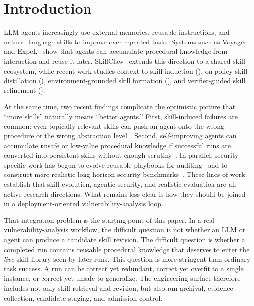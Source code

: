 ﻿\documentclass[preprint,12pt]{elsarticle}
\begin{document}
\section{Introduction}
\label{sec:introduction}

LLM agents increasingly use external memories, reusable instructions, and
natural-language skills to improve over repeated tasks.  Systems such as
Voyager~\cite{voyager} and ExpeL~\cite{expel} show that agents can
accumulate procedural knowledge from interaction and reuse it later.
SkillClaw~\cite{skillclaw} extends this direction to a shared skill
ecosystem, while recent work studies context-to-skill induction
(\cite{ctx2skill}), on-policy skill distillation (\cite{opid}),
environment-grounded skill formation (\cite{spark,skillevolbench}), and
verifier-guided skill refinement (\cite{trace2skill,veriskill}).

At the same time, two recent findings complicate the optimistic picture
that ``more skills'' naturally means ``better agents.''  First,
skill-induced failures are common: even topically relevant skills can push
an agent onto the wrong procedure or the wrong abstraction
level~\cite{skillharmful}.  Second, self-improving agents can accumulate
unsafe or low-value procedural knowledge if successful runs are converted
into persistent skills without enough scrutiny~\cite{misevolution}.  In
parallel, security-specific work has begun to evolve reusable playbooks for
auditing~\cite{evohunt} and to construct more realistic long-horizon
security benchmarks~\cite{secbenchpro}.  These lines of work establish that
skill evolution, agentic security, and realistic evaluation are all active
research directions.  What remains less clear is how they should be joined
in a deployment-oriented vulnerability-analysis loop.

That integration problem is the starting point of this paper.  In a real
vulnerability-analysis workflow, the difficult question is not whether an
LLM or agent can produce a candidate skill revision.  The difficult
question is whether a completed run contains reusable procedural knowledge
that deserves to enter the \emph{live} skill library seen by later runs.
This question is more stringent than ordinary task success.  A run can be
correct yet redundant, correct yet overfit to a single instance, or
correct yet unsafe to generalize.  The engineering surface therefore
includes not only skill retrieval and revision, but also run archival,
evidence collection, candidate staging, and admission control.
\end{document}
